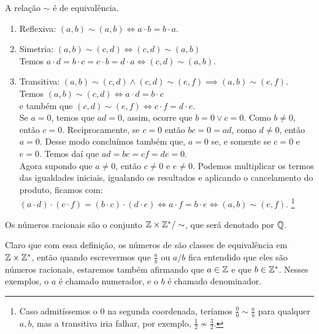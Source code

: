 \documentclass[../main.tex]{subfiles}
\begin{document}
\begin{teo}
    A relação $\sim$ é de equivalência.
\end{teo}
\begin{dem}
    \begin{enumerate}[label=(\roman*)]
        \item Reflexiva: $\left( a,b \right) \sim \left( a,b \right) \iff a  \cdot b=b  \cdot a$.
        \item Simetria: $ \left( a ,b \right) \sim \left( c,d \right) \iff \left( c,d \right) \sim \left( a,b \right) $ \\
        Temos $ a  \cdot d = b  \cdot c = c  \cdot b = d  \cdot a \iff \left( c,d \right) \sim \left( a,b \right) $.
        \item Transitiva: $ \left( a,b \right) \sim \left( c,d \right) \land \left( c,d \right) \sim \left( e,f \right) \implies \left( a,b \right) \sim \left( e,f \right)$. \\
        Temos $\left( a,b \right) \sim \left( c,d \right) \iff a  \cdot d=b  \cdot c$ \\
        e também que $\left( c,d \right) \sim \left( e,f \right) \iff c  \cdot f=d  \cdot e$. \\
        Se $a=0$, temos que $ad = 0$, assim, ocorre que $b=0 \lor c=0$. Como $b \neq 0$, então $c=0$. Reciprocamente, se $c=0$ então $bc = 0 = ad$, como $d \neq 0$, então $a=0$. Desse modo concluímos também que, $a=0$ se, e somente se $c=0$ e $e=0$. Temos daí que $ad = bc = cf = de = 0$. \\
        Agora supondo que $a \neq 0$, então $c \neq 0$ e $e \neq 0$.
        Podemos multiplicar os termos das igualdades iniciais, igualando os resultados e aplicando o cancelamento do produto, ficamos com: \\ 
        $\left( a  \cdot d \right)  \cdot \left( c  \cdot f \right)= \left(b  \cdot c\right)  \cdot \left(d  \cdot e\right) \iff a  \cdot f = b  \cdot e \iff \left( a,b \right) \sim \left( e,f \right)$. \footnote{Caso admitíssemos o $0$ na segunda coordenada, teríamos $\frac{0}{0} \sim \frac{a}{b}$ para qualquer $a,b$, mas a transitiva iria falhar, por exemplo, $\frac{1}{2} \not\sim \frac{3}{2}$.}
    \end{enumerate}
\end{dem}

\begin{defi}
   Os números racionais são o conjunto $\mathbb{Z} \times \mathbb{Z}^* / \sim$, que será denotado por $\mathbb{Q}$.
\end{defi}
Claro que com essa definição, os números de \Q são classes de equivalência em $\mathbb{Z} \times \mathbb{Z}^*$, então quando escrevermos que $\frac{a}{b}$ ou $a/b$ fica entendido que eles são números racionais, estaremos também afirmando que $a \in \mathbb{Z}$ e que $b \in \mathbb{Z}^*$. Nesses exemplos, o $a$ é chamado numerador, e o $b$ é chamado denominador.
\end{document}
